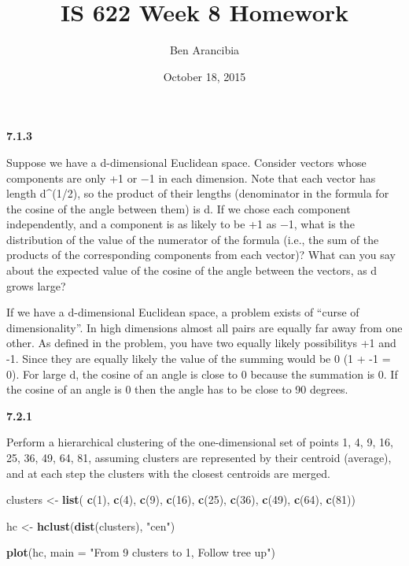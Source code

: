 \documentclass[]{article}
\title{IS 622 Week 8 Homework}
\author{Ben Arancibia}
\date{October 18, 2015}
\newenvironment{Shaded}{\begin{snugshade}}{\end{snugshade}}
\newcommand{\KeywordTok}[1]{\textcolor[rgb]{0.13,0.29,0.53}{\textbf{{#1}}}}
\newcommand{\DataTypeTok}[1]{\textcolor[rgb]{0.13,0.29,0.53}{{#1}}}
\newcommand{\DecValTok}[1]{\textcolor[rgb]{0.00,0.00,0.81}{{#1}}}
\newcommand{\StringTok}[1]{\textcolor[rgb]{0.31,0.60,0.02}{{#1}}}
\newcommand{\NormalTok}[1]{{#1}}
\begin{document}
\maketitle


\textbf{7.1.3}

Suppose we have a d-dimensional Euclidean space. Consider vectors whose
components are only +1 or −1 in each dimension. Note that each vector
has length d\^{}(1/2), so the product of their lengths (denominator in
the formula for the cosine of the angle between them) is d. If we chose
each component independently, and a component is as likely to be +1 as
−1, what is the distribution of the value of the numerator of the
formula (i.e., the sum of the products of the corresponding components
from each vector)? What can you say about the expected value of the
cosine of the angle between the vectors, as d grows large?

If we have a d-dimensional Euclidean space, a problem exists of ``curse
of dimensionality''. In high dimensions almost all pairs are equally far
away from one other. As defined in the problem, you have two equally
likely possibilitys +1 and -1. Since they are equally likely the value
of the summing would be 0 (1 + -1 = 0). For large d, the cosine of an
angle is close to 0 because the summation is 0. If the cosine of an
angle is 0 then the angle has to be close to 90 degrees.

\textbf{7.2.1}

Perform a hierarchical clustering of the one-dimensional set of points
1, 4, 9, 16, 25, 36, 49, 64, 81, assuming clusters are represented by
their centroid (average), and at each step the clusters with the closest
centroids are merged.

\begin{Shaded}
\begin{Highlighting}[]
\NormalTok{clusters <-}\StringTok{ }\KeywordTok{list}\NormalTok{( }\KeywordTok{c}\NormalTok{(}\DecValTok{1}\NormalTok{), }\KeywordTok{c}\NormalTok{(}\DecValTok{4}\NormalTok{), }\KeywordTok{c}\NormalTok{(}\DecValTok{9}\NormalTok{), }\KeywordTok{c}\NormalTok{(}\DecValTok{16}\NormalTok{), }\KeywordTok{c}\NormalTok{(}\DecValTok{25}\NormalTok{), }\KeywordTok{c}\NormalTok{(}\DecValTok{36}\NormalTok{), }\KeywordTok{c}\NormalTok{(}\DecValTok{49}\NormalTok{), }\KeywordTok{c}\NormalTok{(}\DecValTok{64}\NormalTok{), }\KeywordTok{c}\NormalTok{(}\DecValTok{81}\NormalTok{))}

\NormalTok{hc <-}\StringTok{ }\KeywordTok{hclust}\NormalTok{(}\KeywordTok{dist}\NormalTok{(clusters), }\StringTok{"cen"}\NormalTok{)}

\KeywordTok{plot}\NormalTok{(hc, }\DataTypeTok{main =} \StringTok{"From 9 clusters to 1, Follow tree up"}\NormalTok{)}
\end{Highlighting}
\end{Shaded}
\end{document}

